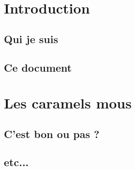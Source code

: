 %
%

\chapter{Introduction}
    \section{Qui je suis}
    \lipsum[1-8]
    
    \section{Ce document}
    \lipsum[1-8]

\chapter{Les caramels mous}
    \section{C'est bon ou pas ?}
    \lipsum[1-8]

    \section{etc...}
